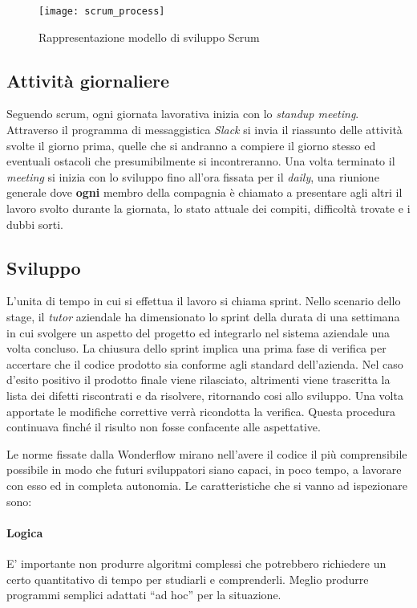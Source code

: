 \begin{figure}[ht]
\begin{center}
\texttt{[image: scrum\_process]}
\caption{Rappresentazione modello di sviluppo Scrum}
\label{fig:scrum_process}
\end{center}
\end{figure}

\subsection{Attività giornaliere}
Seguendo \gls{scrum}, ogni giornata lavorativa inizia con lo
\textit{standup meeting}. Attraverso il programma di messaggistica 
\textit{Slack} si invia il riassunto delle attività svolte il giorno prima,
quelle che si andranno a compiere il giorno stesso ed eventuali ostacoli che
presumibilmente si incontreranno. Una volta terminato il \textit{meeting} si 
inizia con lo sviluppo fino all'ora fissata per il \textit{daily}, una riunione 
generale dove \textbf{ogni} membro della compagnia è chiamato a presentare agli 
altri il lavoro svolto durante la giornata, lo stato attuale dei compiti, 
difficoltà trovate e i dubbi sorti.

\subsection{Sviluppo}
L'unita di tempo in cui si effettua il lavoro si chiama \gls{sprint}.
Nello scenario dello stage, il \textit{tutor} aziendale ha dimensionato 
lo \gls{sprint} della durata di una settimana in cui svolgere un aspetto del
progetto ed integrarlo nel sistema aziendale una volta concluso.
La chiusura dello \gls{sprint} implica una prima fase di \gls{verifica} per 
accertare che il codice prodotto sia conforme agli standard dell'azienda. 
Nel caso d'esito positivo il prodotto finale viene rilasciato, altrimenti viene
trascritta la lista dei difetti riscontrati e da risolvere, ritornando cosi allo
sviluppo. Una volta apportate le modifiche correttive verrà ricondotta la 
verifica. Questa procedura continuava finché il risulto non fosse confacente 
alle aspettative.

Le norme fissate dalla Wonderflow mirano nell'avere il codice il più
comprensibile possibile in modo che futuri sviluppatori siano capaci, in poco
tempo, a lavorare con esso ed in completa autonomia. Le caratteristiche che si
vanno ad ispezionare sono:
\paragraph{Logica}
E' importante non produrre algoritmi complessi che potrebbero richiedere un
certo quantitativo di tempo per studiarli e comprenderli. Meglio produrre
programmi semplici adattati ``ad hoc'' per la situazione.


